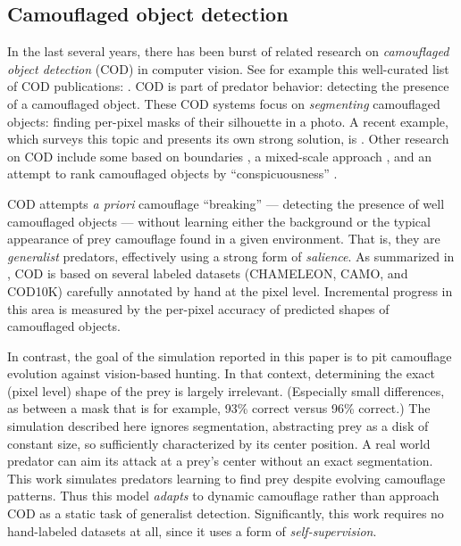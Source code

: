 \documentclass[acmtog]{acmart}
\newcommand{\jargon}[1]{\textit{#1}}
\begin{document}
\subsection{Camouflaged object detection}
In the last several years, there has been burst of related research on \jargon{camouflaged object detection} (COD) in computer vision. See for example this well-curated list of COD publications: \citet{visionxiang_cod}. COD is part of predator behavior: detecting the presence of a camouflaged object. These COD systems focus on \jargon{segmenting} camouflaged objects: finding per-pixel masks of their silhouette in a photo. A recent example, which surveys this topic and presents its own strong solution, is \citet{Zhang2022}. Other research on COD include some based on boundaries \cite{chen_boundary-guided_2022} \cite{sun_boundary-guided_2022}, a mixed-scale approach \cite{pang_zoom_2022}, and an attempt to rank camouflaged objects by “conspicuousness” \cite{lv_cod_2022}.
\par
COD attempts \textit{a priori} camouflage “breaking” — detecting the presence of well camouflaged objects — without learning either the background or the typical appearance of prey camouflage found in a given environment. That is, they are \jargon{generalist} predators, effectively using a strong form of \jargon{salience}. As summarized in \citet{Zhang2022}, COD is based on several labeled datasets (CHAMELEON, CAMO, and COD10K) carefully annotated by hand at the pixel level. Incremental progress in this area is measured by the per-pixel accuracy of predicted shapes of camouflaged objects.
\par
In contrast, the goal of the simulation reported in this paper is to pit camouflage evolution against vision-based hunting. In that context, determining the exact (pixel level) shape of the prey is largely irrelevant. (Especially small differences, as between a mask that is for example, 93\% correct versus 96\% correct.) The simulation described here ignores segmentation, abstracting prey as a disk of constant size, so sufficiently characterized by its center position. A real world predator can aim its attack at a prey's center without an exact segmentation. This work simulates predators learning to find prey despite evolving camouflage patterns. Thus this model \jargon{adapts} to dynamic camouflage rather than approach COD as a static task of generalist detection. Significantly, this work requires no hand-labeled datasets at all, since it uses a form of \jargon{self-supervision}.
\par
\end{document}
